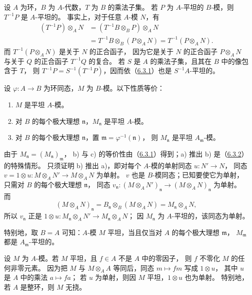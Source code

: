设 $A$ 为环，$B$ 为 $A$-代数，$T$ 为 $B$ 的乘法子集。
若 $P$ 为 $A$-平坦的 $B$-模，则 $T^{-1}P$ 是 $A$-平坦的。
事实上，对于任意 $A$-模 $N$，有
\[
 \begin{aligned}
 (T^{-1}P)\otimes_A N
 &=(T^{-1}B\otimes_B P)\otimes_A N\\
 &=T^{-1}B\otimes_B(P\otimes_A N)
 =T^{-1}(P\otimes_A N).
 \end{aligned}
\]
而 $T^{-1}(P\otimes_A N)$ 是关于 $N$ 的正合函子，
因为它是关于 $N$ 的正合函子 $P\otimes_A N$ 与关于 $Q$ 的正合函子 $T^{-1}Q$ 的复合。
若 $S$ 是 $A$ 的乘法子集，且其在 $B$ 中的像包含于 $T$，
则 $T^{-1}P=S^{-1}(T^{-1}P)$，因而依（\hyperlink{para:0:6.3.1}{6.3.1}）也是 $S^{-1}A$-平坦的。

设 $\varphi\colon A\to B$ 为环同态，$M$ 为 $B$-模。以下性质等价：
\begin{enumerate}[label=\alph*)]
\item $M$ 是平坦 $A$-模。
\item 对 $B$ 的每个极大理想 $\mathfrak n$，$M_{\mathfrak n}$ 是平坦 $A$-模。
\item 对 $B$ 的每个极大理想 $\mathfrak n$，置 $\mathfrak m=\varphi^{-1}(\mathfrak n)$，
则 $M_{\mathfrak n}$ 是平坦 $A_{\mathfrak m}$-模。
\end{enumerate}
由于 $M_{\mathfrak n}=(M_{\mathfrak n})_{\mathfrak m}$，
b) 与 c) 的等价性由（\hyperlink{para:0:6.3.1}{6.3.1}）得到；a) 推出 b) 是（\hyperlink{para:0:6.3.2}{6.3.2}）的特殊情形。
只须证明 b) 推出 a)，即对每个 $A$-模的单射同态 $u\colon N'\to N$，
同态 $v=1\otimes u\colon M\otimes_A N'\to M\otimes_A N$ 为单射。
$v$ 也是 $B$-模同态；已知要使它为单射，只需对 $B$ 的每个极大理想 $\mathfrak n$，
同态 $v_{\mathfrak n}\colon(M\otimes_A N')_{\mathfrak n}\to(M\otimes_A N)_{\mathfrak n}$ 为单射。
而
\[
 (M\otimes_A N)_{\mathfrak n}
 =B_{\mathfrak n}\otimes_B(M\otimes_A N)
 =M_{\mathfrak n}\otimes_A N,
\]
所以 $v_{\mathfrak n}$ 正是
$1\otimes u\colon M_{\mathfrak n}\otimes_A N'\to M_{\mathfrak n}\otimes_A N$；
因 $M_{\mathfrak n}$ 为 $A$-平坦的，该同态为单射。

特别地，取 $B=A$ 可知：$A$-模 $M$ 平坦，当且仅当对 $A$ 的每个极大理想 $\mathfrak m$，
$M_{\mathfrak m}$ 都是 $A_{\mathfrak m}$-平坦的。

设 $M$ 为 $A$-模。若 $M$ 平坦，且 $f\in A$ 不是 $A$ 中的零因子，
则 $f$ 不零化 $M$ 的任何非零元素。
因为把 $M$ 与 $M\otimes_A A$ 等同后，同态 $m\mapsto fm$ 写成 $1\otimes u$，
其中 $u$ 是 $A$ 中的乘法 $a\mapsto fa$；
若 $u$ 为单射，则因 $M$ 平坦，$1\otimes u$ 也为单射。
特别地，若 $A$ 是整环，则 $M$ 无挠。

